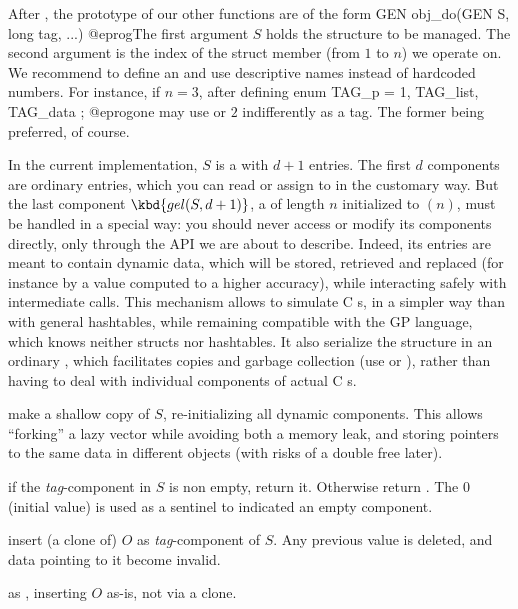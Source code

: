 After , the prototype of our other functions are of
the form
\bprog
  GEN obj_do(GEN S, long tag, ...)
@eprog\noindent The first argument $S$ holds the structure to be managed.
The second argument  is the index of the struct member (from $1$ to
$n$) we operate on. We recommend to define an  and use descriptive
names instead of hardcoded numbers. For instance, if $n = 3$, after defining
\bprog
  enum { TAG_p = 1, TAG_list, TAG_data };
@eprog\noindent one may use  or $2$ indifferently as a tag.
The former being preferred, of course.

In the current implementation, $S$ is a  with $d+1$ entries.
The first $d$ components are ordinary  entries, which you can
read or assign to in the customary way. But the last component $\kbd{gel(S,
d+1)}$, a  of length $n$ initialized to $(n)$, must
be handled in a special way: you should never access or modify its components
directly, only through the API we are about to describe. Indeed, its entries
are meant to contain dynamic data, which will be stored, retrieved and
replaced (for instance by a value computed to a higher accuracy), while
interacting safely with intermediate  calls. This mechanism
allows to simulate C s, in a simpler way than with general
hashtables, while remaining compatible with the GP language, which knows
neither structs nor hashtables. It also serialize the structure in an
ordinary , which facilitates copies and garbage collection (use
 or ), rather than having to deal with individual
components of actual C s.

 make a shallow copy of $S$, re-initializing
all dynamic components. This allows ``forking'' a lazy vector while
avoiding both a memory leak, and storing pointers to the same data
in different objects (with risks of a double free later).

 if the \emph{tag}-component in $S$
is non empty, return it. Otherwise return . The  $0$
(initial value) is used as a sentinel to indicated an empty component.

 insert (a clone of) $O$
as \emph{tag}-component of $S$. Any previous value is deleted, and
data pointing to it become invalid.

 as ,
inserting $O$ as-is, not via a clone.

